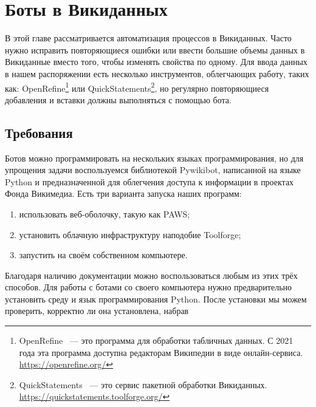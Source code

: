 \chapter{Боты в Викиданных}
\label{ch:bots}
В этой главе рассматривается автоматизация процессов в Викиданных. Часто нужно исправить повторяющиеся ошибки или ввести большие объемы данных в Викиданные вместо того, чтобы изменять свойства по одному. Для ввода данных в нашем распоряжении есть несколько инструментов, облегчающих работу, таких как: OpenRefine\footnote{OpenRefine ~--- это программа для обработки табличных данных. С 2021 года эта программа доступна редакторам Википедии в виде онлайн-сервиса. \url{https://openrefine.org/}} или QuickStatements\footnote{QuickStatements ~--- это сервис пакетной обработки Викиданных. \url{https://quickstatements.toolforge.org/}}, но регулярно повторяющиеся добавления и вставки должны выполняться с помощью бота.

\section{Требования}
\label{sec:requirements}
Ботов можно программировать на нескольких языках программирования, но для упрощения задачи воспользуемся библиотекой Pywikibot, написанной на языке Python и предназначенной для облегчения доступа к информации в проектах Фонда Викимедиа. Есть три варианта запуска наших программ:
\begin{enumerate}
  \setlength{\itemindent}{2em}
  \item использовать веб-оболочку, такую как PAWS; 
  \item установить облачную инфраструктуру наподобие Toolforge;
  \item запустить на своём собственном компьютере.
\end{enumerate}

Благодаря наличию документации можно воспользоваться любым из этих трёх способов. Для работы с ботами со своего компьютера нужно предварительно установить среду и язык программирования Python. После установки мы можем проверить, корректно ли она установлена, набрав

